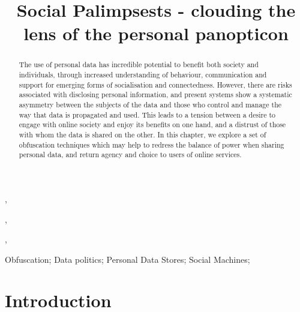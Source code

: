 \documentclass{IOS-Book-Article}     %
\begin{document}
\begin{frontmatter}          %
%
\title{Social Palimpsests - clouding the lens of the personal panopticon}

\author[A]{ },
\author[B]{ },
\author[B]{ },
\author[B]{ }

\address[A]{Centre for Intelligent Systems and Applications,
Department of Informatics, University of Edinburgh}
\address[B]{Web and Internet Science Research Group, Electronics and Computer Science, University of Southampton}

\begin{abstract}
The use of personal data has incredible potential to benefit both society and
individuals, through increased understanding of behaviour, communication and
support for emerging forms of socialisation and connectedness. However, there
are risks associated with disclosing personal information, and present systems
show a systematic asymmetry between the subjects of the data and those who
control and manage the way that data is propagated and used. This leads to a
tension between a desire to engage with online society and enjoy its benefits on
one hand, and a distrust of those with whom the data is shared on the other.
In this chapter, we
explore a set of obfuscation techniques which may help to redress the balance of
power when sharing personal data, and return agency and choice to users of
online services.
\end{abstract}

\begin{keyword}
Obfuscation; Data politics; Personal Data Stores; Social Machines; 
\end{keyword}

\end{frontmatter}


\section*{Introduction}

\end{document}
